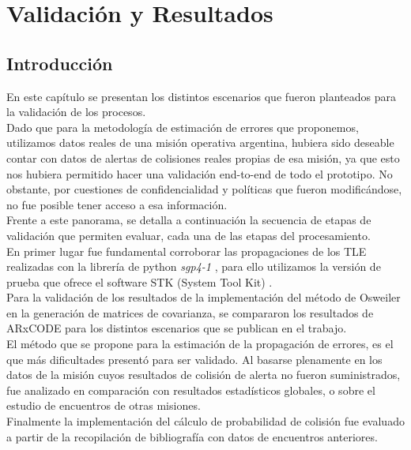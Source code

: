 \chapter{Validaci\'on y Resultados}
\label{chap:resultados}


\section{Introducci\'on}
En este cap\'itulo se presentan los distintos escenarios que fueron planteados para la validaci\'on de los procesos.\\
Dado que para la metodolog\'ia de estimaci\'on de errores que proponemos, utilizamos datos reales de una misi\'on operativa argentina, hubiera sido
deseable contar con datos de alertas de colisiones reales propias de esa misi\'on, ya que esto nos hubiera permitido hacer una validaci\'on end-to-end de todo el prototipo. No obstante, por cuestiones de confidencialidad y pol\'iticas que fueron modific\'andose, no fue posible tener acceso a esa informaci\'on.\\
Frente a este panorama, se detalla a continuaci\'on la secuencia de etapas de validaci\'on que permiten evaluar, cada una de las etapas del procesamiento.\\

En primer lugar fue fundamental corroborar las propagaciones de los TLE realizadas con la librer\'ia de python {\it{sgp4-1}} \citep{sgp4python}, para ello utilizamos la versi\'on de prueba que ofrece el software STK (System Tool Kit) \citep{stk}.\\
Para la validaci\'on de los resultados de la implementaci\'on del m\'etodo de Osweiler en la generaci\'on de matrices de covarianza, se compararon los resultados de ARxCODE para los distintos escenarios que se publican en el trabajo.\\

El m\'etodo que se propone para la estimaci\'on de la propagaci\'on de errores, es el que m\'as dificultades present\'o para ser validado. Al basarse plenamente en los datos de la misi\'on cuyos resultados de colisi\'on de alerta no fueron suministrados, fue analizado en comparaci\'on con resultados estad\'isticos globales, o sobre el estudio de encuentros de otras misiones.\\

Finalmente la implementaci\'on del c\'alculo de probabilidad de colisi\'on fue evaluado a partir de la recopilaci\'on de bibliograf\'ia con datos de encuentros anteriores.\\


